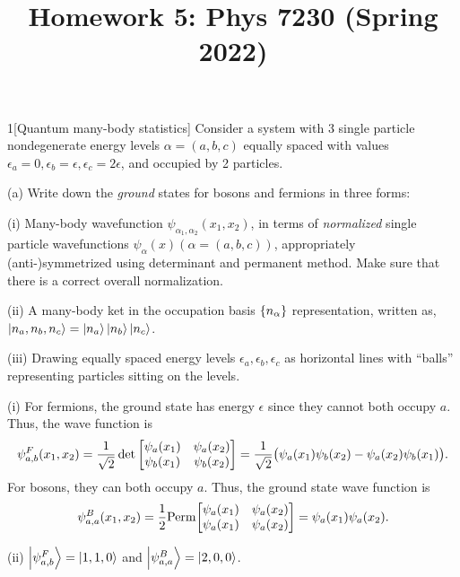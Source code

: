 \documentclass[12pt]{article}
\title{Homework 5: Phys 7230 (Spring 2022)}
\begin{document}
\maketitle
\begin{problem}{1}[Quantum many-body statistics]
Consider a system with 3 single particle nondegenerate energy levels
$\alpha=(a,b,c)$ equally spaced with values
$\epsilon_a=0,\epsilon_b=\epsilon,\epsilon_c=2\epsilon$, and occupied by 2
particles.

(a) Write down the \textit{ground} states for bosons and fermions in three
forms:

\qquad(i) Many-body wavefunction $\psi_{\alpha_1,\alpha_2}(x_1,x_2)$, in terms
of \textit{normalized} single particle wavefunctions
$\psi_\alpha(x)(\alpha=(a,b,c))$, appropriately (anti-)symmetrized using
determinant and permanent method. Make sure that there is a correct overall
normalization.

\qquad(ii) A many-body ket in the occupation basis $\qty{n_\alpha}$
representation, written as, $\ket{n_a,n_b,n_c}=\ket{n_a}\ket{n_b}\ket{n_c}$.

\qquad(iii) Drawing equally spaced energy levels
$\epsilon_a,\epsilon_b,\epsilon_c$ as horizontal lines with ``balls''
representing particles sitting on the levels.
\begin{solution}
(i) For fermions, the ground state has energy $\epsilon$ since they cannot
both occupy $a$. Thus, the wave function is
\begin{equation}
    \psi_{a,b}^F(x_1,x_2)
    =\frac1{\sqrt2}\det\mqty[\psi_a(x_1)&\psi_a(x_2)\\\psi_b(x_1)&\psi_b(x_2)]
    =\frac1{\sqrt2}\qty(\psi_a(x_1)\psi_b(x_2)-\psi_a(x_2)\psi_b(x_1)).
\end{equation}
For bosons, they can both occupy $a$. Thus, the ground state wave function is
\begin{equation}
    \psi_{a,a}^B(x_1,x_2)
    =\frac1{2}\t{Perm}\mqty[\psi_a(x_1)&\psi_a(x_2)\\\psi_a(x_1)&\psi_a(x_2)]
=\psi_a(x_1)\psi_a(x_2).
\end{equation}

(ii) $\ket{\psi_{a,b}^F}=\ket{1,1,0}$ and $\ket{\psi_{a,a}^B}=\ket{2,0,0}$.
\end{solution}


\end{problem}
\end{document}
